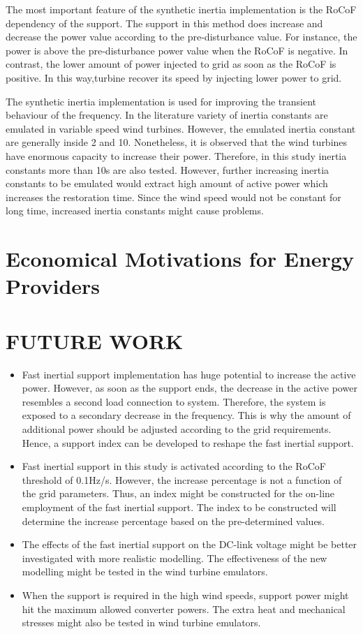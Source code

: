 The most important feature of the synthetic inertia implementation is the RoCoF dependency of the support. The support in this method does increase and decrease the power value according to the pre-disturbance value. For instance, the power is above the pre-disturbance power value when the RoCoF is negative. In contrast, the lower amount of power injected to grid as soon as the RoCoF is positive. In this way,turbine recover its speed by injecting lower power to grid.\par
The synthetic inertia implementation is used for improving the transient behaviour of the frequency. In the literature variety of inertia constants are emulated in variable speed wind turbines. However, the emulated inertia constant are generally inside 2 and 10. Nonetheless, it is observed that the wind turbines have enormous capacity to increase their power. Therefore, in this study inertia constants more than 10s are also tested. However, further increasing inertia constants to be emulated would extract high amount of active power which increases the restoration time. Since the wind speed would not be constant for long time, increased inertia constants might cause problems.\par 
\section{Economical Motivations for Energy Providers}

\section{FUTURE WORK}
\begin{itemize}
	\item Fast inertial support implementation has huge potential to increase the active power. However, as soon as the support ends, the decrease in the active power resembles a second load connection to system. Therefore, the system is exposed to a secondary decrease in the frequency. This is why the amount of additional power should be adjusted according to the grid requirements. Hence, a support index can be developed to reshape the fast inertial support. 
	\item Fast inertial support in this study is activated according to the RoCoF threshold of 0.1Hz/s. However, the increase percentage is not a function of the grid parameters. Thus, an index might be constructed for the on-line employment of the fast inertial support. The index to be constructed will determine the increase percentage based on the pre-determined values. 
	\item The effects of the fast inertial support on the DC-link voltage might be better investigated with more realistic modelling. The effectiveness of the new modelling might be tested in the wind turbine emulators. 
	\item When the support is required in the high wind speeds, support power might hit the maximum allowed converter powers. The extra heat and mechanical stresses might also be tested in wind turbine emulators. 
\end{itemize}